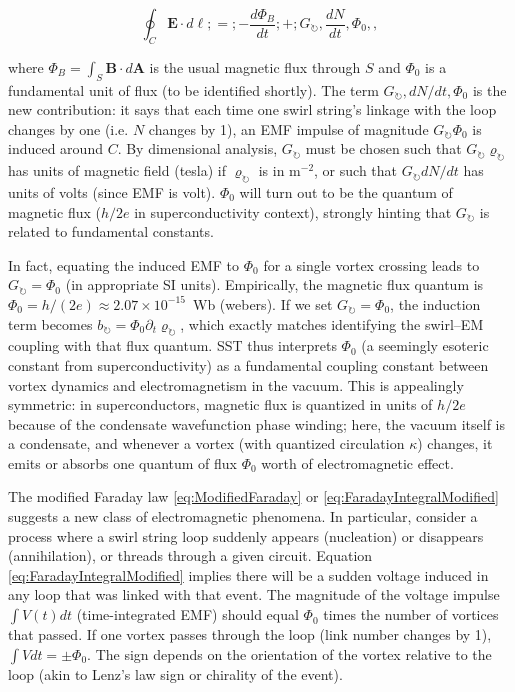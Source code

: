 \documentclass[10pt,reprint,aps,onecolumn,nofootinbib]{revtex4-2}
\begin{document}
\begin{equation}

\oint_{C} \mathbf{E}\cdot d\bm{\ell} ;=; -\frac{d\Phi_B}{dt} ;+; G_{\circlearrowright},\frac{dN}{dt},\Phi_0,,

\label{eq:FaradayIntegralModified}

\end{equation}

where $\Phi_B = \int_S \mathbf{B}\cdot d\mathbf{A}$ is the usual magnetic flux through $S$ and $\Phi_0$ is a fundamental unit of flux (to be identified shortly). The term $G_{\circlearrowright},dN/dt ,\Phi_0$ is the new contribution: it says that each time one swirl string’s linkage with the loop changes by one (i.e. $N$ changes by 1), an EMF impulse of magnitude $G_{\circlearrowright}\Phi_0$ is induced around $C$. By dimensional analysis, $G_{\circlearrowright}$ must be chosen such that $G_{\circlearrowright} \varrho_{\circlearrowright}$ has units of magnetic field (tesla) if $\varrho_{\circlearrowright}$ is in m$^{-2}$, or such that $G_{\circlearrowright} dN/dt$ has units of volts (since EMF is volt). $\Phi_0$ will turn out to be the quantum of magnetic flux ($h/2e$ in superconductivity context), strongly hinting that $G_{\circlearrowright}$ is related to fundamental constants.


In fact, equating the induced EMF to $\Phi_0$ for a single vortex crossing leads to $G_{\circlearrowright} = \Phi_0$ (in appropriate SI units). Empirically, the magnetic flux quantum is $\Phi_0 = h/(2e) \approx 2.07\times10^{-15}$~Wb (webers). If we set $G_{\circlearrowright} = \Phi_0$, the induction term becomes $b_{\circlearrowright} = \Phi_0 \partial_t \varrho_{\circlearrowright}$, which exactly matches identifying the swirl–EM coupling with that flux quantum. SST thus interprets $\Phi_0$ (a seemingly esoteric constant from superconductivity) as a fundamental coupling constant between vortex dynamics and electromagnetism in the vacuum. This is appealingly symmetric: in superconductors, magnetic flux is quantized in units of $h/2e$ because of the condensate wavefunction phase winding; here, the vacuum itself is a condensate, and whenever a vortex (with quantized circulation $\kappa$) changes, it emits or absorbs one quantum of flux $\Phi_0$ worth of electromagnetic effect.


The modified Faraday law \eqref{eq:ModifiedFaraday} or \eqref{eq:FaradayIntegralModified} suggests a new class of electromagnetic phenomena. In particular, consider a process where a swirl string loop suddenly appears (nucleation) or disappears (annihilation), or threads through a given circuit. Equation \eqref{eq:FaradayIntegralModified} implies there will be a sudden voltage induced in any loop that was linked with that event. The magnitude of the voltage impulse $\int V(t) dt$ (time-integrated EMF) should equal $\Phi_0$ times the number of vortices that passed. If one vortex passes through the loop (link number changes by 1), $\int V dt = \pm \Phi_0$. The sign depends on the orientation of the vortex relative to the loop (akin to Lenz’s law sign or chirality of the event).
\end{document}
